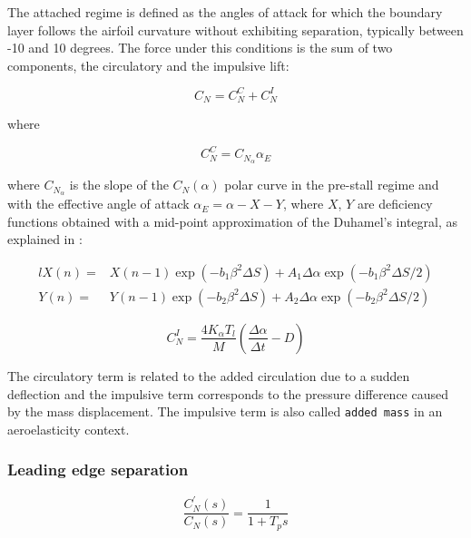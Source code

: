 The attached regime is defined as the angles of attack for which the boundary layer follows the airfoil curvature without exhibiting separation, typically between -10 and 10 degrees. The force under this conditions is the sum of two components, the circulatory and the impulsive lift: 

\begin{equation}
C_N = C_N^C + C_N^I
\end{equation}

\noindent where

\begin{equation}
C_N^C = C_{N_\alpha} \alpha_{E}
\label{eq:circulatory}
\end{equation}

\noindent where $C_{N_\alpha}$ is the slope of the $C_N(\alpha)$ polar curve in the pre-stall regime and with the effective angle of attack $\alpha_E = \alpha - X - Y$, where $X$, $Y$ are deficiency functions obtained with a mid-point approximation of the Duhamel's integral, as explained in \autocite{leishman_principles_2000}:

\begin{eqnarray}{l}
X(n)= & X(n-1) \exp \left(-b_{1} \beta^{2} \Delta S\right)+A_{1} \Delta \alpha \exp \left(-b_{1} \beta^{2} \Delta S / 2\right) \\
Y(n)= & Y(n-1) \exp \left(-b_{2} \beta^{2} \Delta S\right)+A_{2} \Delta \alpha \exp \left(-b_{2} \beta^{2} \Delta S / 2\right)
\end{eqnarray}

\begin{equation}
C_{N}^{I}=\frac{4 K_{\alpha} T_{l}}{M}\left(\frac{\Delta \alpha}{\Delta t}-D\right)
\label{eq:impulsive}
\end{equation}

 The circulatory term is related to the added circulation due to a sudden deflection and the impulsive term corresponds to the pressure difference caused by the mass displacement. The impulsive term is also called \texttt{added mass} in an aeroelasticity context.

\subsubsection{Leading edge separation}

\begin{equation}
\frac{C_N^{\prime}(s)}{C_N(s)} = \frac{1}{1+T_p s}
\label{•}  
\end{equation}

